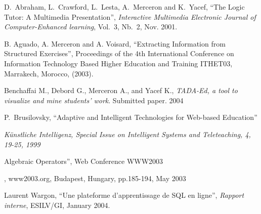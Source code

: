 \documentclass[10pt,twocolumn]{IEEEtran}
\begin{document}
\begin{thebibliography}{12}


D.~Abraham, L.~Crawford, L.~Lesta, A.~Merceron  and K.~Yacef,
``The Logic Tutor: A Multimedia Presentation'', {\em Interactive 
Multimedia Electronic Journal of Computer-Enhanced learning}, Vol.~3, 
Nb.~2, Nov. 2001.



 B. Aguado, A. Merceron and A. Voisard, ``Extracting
Information from Structured Exercises'',  Proceedings of  the 4th
International Conference on Information Technology Based Higher
Education and Training ITHET03, Marrakech, Morocco, (2003).

Benchaffai M., Debord G., Merceron A., and Yacef K., {\it TADA-Ed, a tool to visualize and mine students' work}. Submitted paper. 2004


 P.~Brusilovsky, ``Adaptive and Intelligent
Technologies for Web-based Education'' {\em K\"unstliche Intelligenz,
Special Issue on Intelligent Systems and Teleteaching,  4, 19-25, 1999

Algebraic Operators'',
Web Conference WWW2003}, www2003.org, Budapest, Hungary, pp.185-194, May 
2003



Laurent Wargon, ``Une plateforme d'apprentissage de SQL en ligne'', {\em Rapport interne},
ESILV/GI, January 2004.


\end{thebibliography}
\end{document}
